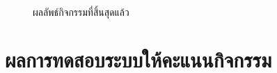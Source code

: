 \begin{figure}[H]
    \begin{center}
    \end{center}
    \caption[ผลทดลองกิจกรรมที่สิ้นสุดแล้ว]{ผลลัพธ์กิจกรรมที่สิ้นสุดแล้ว}
    \label{fig:already-ended}
\end{figure}
\section{ผลการทดสอบระบบให้คะแนนกิจกรรม}
